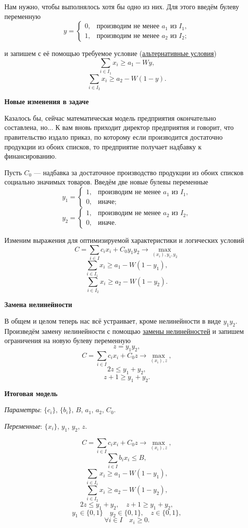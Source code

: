 Нам нужно, чтобы выполнялось хотя бы одно из них. Для этого введём булеву переменную
\[
y = \begin{cases}
	0, & \text{производим не менее $a_1$ из $I_1$}, \\
	1, & \text{производим не менее $a_2$ из $I_2$};
\end{cases}
\]

и запишем с её помощью требуемое условие (\hyperref[fact:alternative_conditions]{альтернативные условия})
\[
\sum_{i \in I_1} x_i \ge a_1 - Wy,
\]
\[
\sum_{i \in I_2} x_i \ge a_2 - W(1 - y).
\]

\textbf{Новые изменения в задаче}

Казалось бы, сейчас математическая модель предприятия окончательно составлена, но... К вам вновь приходит директор предприятия и говорит, что правительство издало приказ, по которому если производится достаточно продукции из обоих списков, то предприятие получает надбавку к финансированию.

Пусть $C_0$ --- надбавка за достаточное производство продукции из обоих списков социально значимых товаров. Введём две новые булевы переменные
\[
y_1 = \begin{cases}
	1, & \text{производим не менее $a_1$ из $I_1$}, \\
	0, & \text{иначе};
\end{cases}
\]
\[
y_2 = \begin{cases}
	1, & \text{производим не менее $a_2$ из $I_2$}, \\
	0, & \text{иначе}.
\end{cases}
\]

Изменим выражения для оптимизируемой характеристики и логических условий
\[
C = \sum_{i \in I}c_i x_i + C_0 y_1 y_2 \to \max_{(x_i), y_1, y_2}
\]
\[
\sum_{i \in I_1} x_i \ge a_1 - W(1 - y_1),
\]
\[
\sum_{i \in I_2} x_i \ge a_2 - W(1 - y_2).
\]

\textbf{Замена нелинейности}

В общем и целом теперь нас всё устраивает, кроме нелинейности в виде $y_1 y_2$. Произведём замену нелинейности с помощью \hyperref[fact:substituion_of_nonlinear]{замены нелинейностей} и запишем ограничения на новую булеву переменную
\[
z = y_1 y_2,
\]
\[
C = \sum_{i \in I}c_i x_i + C_0 z \to \max_{(x_i), z},
\]
\[
2z \le y_1 + y_2,
\]
\[
z + 1 \ge y_1 + y_2.
\]

\textbf{Итоговая модель}

\textit{Параметры}: $\{c_i\}$, $\{b_i\}$, $B$, $a_1$, $a_2$, $C_0$.

\textit{Переменные}: $\{x_i\}$, $y_1$, $y_2$, $z$.

\[
C = \sum_{i \in I}c_i x_i + C_0 z \to \max_{(x_i), z},
\]
\[
\sum_{i \in I}b_i x_i \le B,
\]
\[
\sum_{i \in I_1} x_i \ge a_1 - W(1 - y_1),
\]
\[
\sum_{i \in I_2} x_i \ge a_2 - W(1 - y_2),
\]
\[
2z \le y_1 + y_2, \quad z + 1 \ge y_1 + y_2,
\]
\[
y_1 \in \{0, 1\} \quad y_2 \in \{0, 1\}, \quad z \in \{0, 1\},
\]
\[
\forall i \in I \quad x_i \ge 0.
\]
